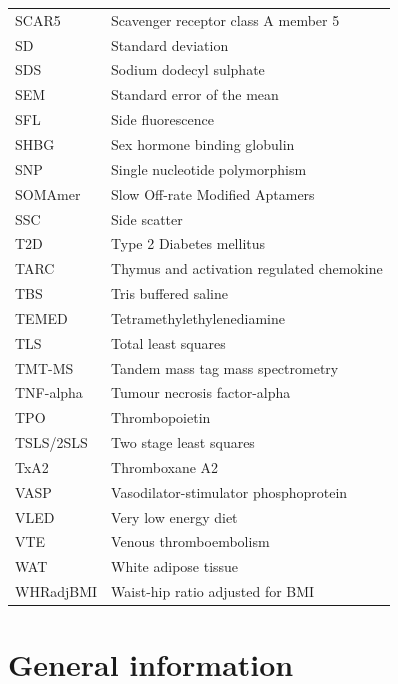 \documentclass[11pt,twoside]{bristolthesis}
\newcommand\blankpage{%
    \null
    \thispagestyle{empty}%
    \addtocounter{page}{-1}%
    \newpage}
\begin{document}
\begin{abbreviations}
\begin{longtable}[t]{ll}
    SCAR5 & Scavenger receptor class A member 5\\
    \addlinespace
    SD & Standard deviation\\
    SDS & Sodium dodecyl sulphate\\
    SEM & Standard error of the mean\\
    SFL & Side fluorescence\\
    SHBG & Sex hormone binding globulin\\
    \addlinespace
    SNP & Single nucleotide polymorphism\\
    SOMAmer & Slow Off-rate Modified Aptamers\\
    SSC & Side scatter\\
    T2D & Type 2 Diabetes mellitus\\
    TARC & Thymus and activation regulated chemokine\\
    \addlinespace
    TBS & Tris buffered saline\\
    TEMED & Tetramethylethylenediamine\\
    TLS & Total least squares\\
    TMT-MS & Tandem mass tag mass spectrometry\\
    TNF-alpha & Tumour necrosis factor-alpha\\
    \addlinespace
    TPO & Thrombopoietin\\
    TSLS/2SLS & Two stage least squares\\
    TxA2 & Thromboxane A2\\
    VASP & Vasodilator-stimulator phosphoprotein\\
    VLED & Very low energy diet\\
    \addlinespace
    VTE & Venous thromboembolism\\
    WAT & White adipose tissue\\
    WHRadjBMI & Waist-hip ratio adjusted for BMI\\
    \bottomrule
    \end{longtable}
    \afterpage{\blankpage}
  \end{abbreviations}
\endgroup


\mainmatter %
\pagestyle{plain}

\hypertarget{general-information}{%
\chapter{General information}\label{general-information}}
\end{document}
